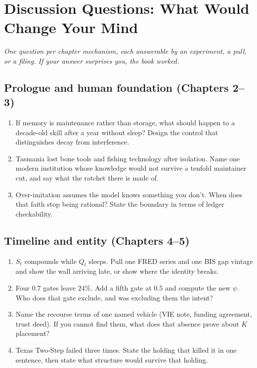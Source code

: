 \chapter{Discussion Questions: What Would Change Your Mind}

\textit{One question per chapter mechanism, each answerable by an experiment, a pull, or a filing. If your answer surprises you, the book worked.}

\section*{Prologue and human foundation (Chapters 2--3)}

\begin{enumerate}
\item If memory is maintenance rather than storage, what should happen to a decade-old skill after a year without sleep? Design the control that distinguishes decay from interference.
\item Tasmania lost bone tools and fishing technology after isolation. Name one modern institution whose knowledge would not survive a tenfold maintainer cut, and say what the ratchet there is made of.
\item Over-imitation assumes the model knows something you don't. When does that faith stop being rational? State the boundary in terms of ledger checkability.
\end{enumerate}

\section*{Timeline and entity (Chapters 4--5)}

\begin{enumerate}
\item $S_t$ compounds while $Q_t$ sleeps. Pull one FRED series and one BIS gap vintage and show the wall arriving late, or show where the identity breaks.
\item Four $0.7$ gates leave $24\%$. Add a fifth gate at $0.5$ and compute the new $\psi$. Who does that gate exclude, and was excluding them the intent?
\item Name the recourse terms of one named vehicle (VIE note, funding agreement, trust deed). If you cannot find them, what does that absence prove about $K$ placement?
\item Texas Two-Step failed three times. State the holding that killed it in one sentence, then state what structure would survive that holding.
\end{enumerate}

